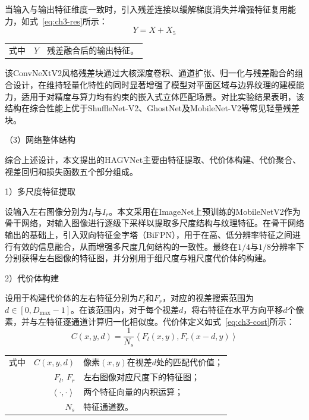 当输入与输出特征维度一致时，引入残差连接以缓解梯度消失并增强特征复用能力，如式~\eqref{eq:ch3-res}所示：
\begin{equation}\label{eq:ch3-res}
Y=X+X_5
\end{equation}
\begin{tabularx}{\textwidth}{@{}l@{\quad}r@{———}X@{}}
式中& $Y$ & 残差融合后的输出特征。\\
\end{tabularx}\vspace{3.15bp}

该ConvNeXtV2风格残差块通过大核深度卷积、通道扩张、归一化与残差融合的组合设计，在维持轻量化特性的同时显著增强了模型对平面区域与边界纹理的建模能力，适用于对精度与算力均有约束的嵌入式立体匹配场景。对比实验结果表明，该结构在综合性能上优于ShuffleNet-V2、GhostNet\cite{hanGhostnetMoreFeatures2020a}及MobileNet-V2\cite{sandlerMobilenetv2InvertedResiduals2018}等常见轻量残差块。

（3）网络整体结构

综合上述设计，本文提出的HAGVNet主要由特征提取、代价体构建、代价聚合、视差回归和损失函数五个部分组成。

1）多尺度特征提取

设输入左右图像分别为$I_l$与$I_r$。本文采用在ImageNet\cite{dengImagenetLargescaleHierarchical2009a}上预训练的MobileNetV2\cite{sandlerMobilenetv2InvertedResiduals2018}作为骨干网络，对输入图像进行逐级下采样以提取多尺度结构与纹理特征。在骨干网络输出的基础上，引入双向特征金字塔（BiFPN\cite{tanEfficientdetScalableEfficient2020b}），用于在高、低分辨率特征之间进行有效的信息融合，从而增强多尺度几何结构的一致性。最终在$1/4$与$1/8$分辨率下分别获得左右图像的特征图，并分别用于细尺度与粗尺度代价体的构建。

2）代价体构建

设用于构建代价体的左右特征分别为$F_l$和$F_r$，对应的视差搜索范围为$d\in[0,D_{\max}-1]$。在该范围内，对于每个视差$d$，将右特征在水平方向平移$d$个像素，并与左特征逐通道计算归一化相似度。代价体定义如式~\eqref{eq:ch3-cost}所示：
\begin{equation}\label{eq:ch3-cost}
C(x,y,d)=\frac{1}{N_s}\left\langle F_l(x,y),F_r(x-d,y)\right\rangle
\end{equation}
\begin{tabularx}{\textwidth}{@{}l@{\quad}r@{———}X@{}}
式中& $C(x,y,d)$ & 像素$(x,y)$在视差$d$处的匹配代价值；\\
& $F_l,\,F_r$ & 左右图像对应尺度下的特征图；\\
& $\left\langle \cdot,\cdot \right\rangle$ & 两个特征向量的内积运算；\\
& $N_s$ & 特征通道数。\\
\end{tabularx}\vspace{3.15bp}


